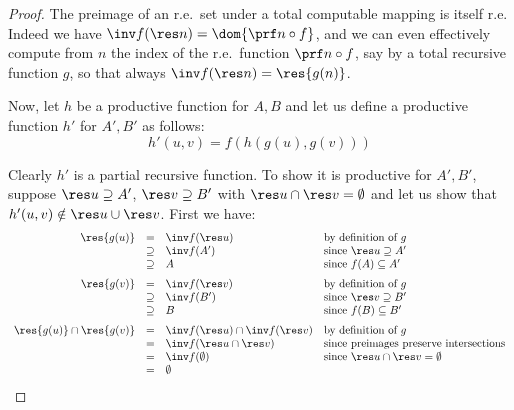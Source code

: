 \begin{proof}
The preimage of an r.e.\ set under a total computable mapping is itself r.e.
Indeed we have $\inv f (\res n) = \dom {\prf n \circ f}$, and we can even effectively compute from $n$ the index of the r.e.\ function $\prf n\circ f $, say by a total recursive function $g$, so that always $\inv f(\res n) = \res {g(n)}$.

Now, let $h$ be a productive function for $A,B$ and let us define a productive function $h'$ for $A',B'$ as follows: \[h'(u,v) = f(h(g(u), g(v)))\] 

Clearly $h'$ is a partial recursive function.
To show it is productive for $A',B'$, suppose
  $\res u \supseteq A'$, $\res v \supseteq B'$ with
  $\res u \cap \res v = \emptyset$ and let us show that $h'(u,v) \notin \res u \cup \res v$. 
First we have:
\[
\begin{array}{rcll}
     \res{g(u)} & = & \inv f (\res u ) & \text{by definition of $g$} \\
        & \supseteq & \inv f (A') & \text{since $\res u \supseteq A'$} \\
        & \supseteq & A & \text{since $f(A) \subseteq A'$} \\
    \noalign{\medskip}
    \res{g(v)} & = & \inv f (\res v ) & \text{by definition of $g$} \\
        & \supseteq & \inv f (B') & \text{since $\res v \supseteq B'$} \\
        & \supseteq & B & \text{since $f(B) \subseteq B'$} \\
    \noalign{\medskip}
    \res{g(u)} \cap \res{g(v)} & = & \inv f (\res u) \cap \inv f (\res v) & \text{by definition of $g$} \\
        & = & \inv f (\res u \cap \res v ) & \text{since preimages preserve intersections}\\
        & = & \inv f (\emptyset) & \text{since $\res u \cap \res v = \emptyset$} \\
        & = & \emptyset
\end{array}
\]




\end{proof}
